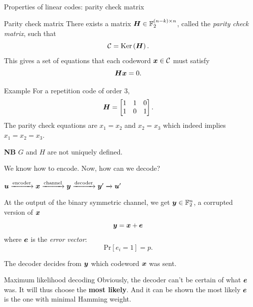 \documentclass[10pt]{beamer}
\newcommand{\gf}{\mathbb{F}_2}
\renewcommand{\ker}[1]{\text{Ker}\left(#1\right)}
\begin{document}
\begin{frame}{Properties of linear codes: parity check matrix}
    \begin{block}{Parity check matrix}
        There exists a matrix $\mH \in \gf^{(n-k)\times n}$, called the \textit{parity
        check matrix}, such that
        \[ \mathcal{C} = \ker{\mH}. \]
        This gives a set of equations that each codeword $\boldsymbol{x} \in \mathcal{C}$ must satisfy
        \[ \boldsymbol{H}\boldsymbol{x} = 0. \]
    \end{block}
    
    \begin{exampleblock}{Example}
        For a repetition code of order 3,
        \[ \boldsymbol{H} =
        \begin{bmatrix}
            1 & 1 & 0 \\
            1 & 0 & 1
        \end{bmatrix}. \]
        The parity check equations are $x_1 = x_2$ and $x_2 = x_3$ which indeed implies
        $x_1 = x_2 = x_3$.
    \end{exampleblock}

    \textbf{NB} $G$ and $H$ are not uniquely defined.
\end{frame}

\begin{frame}{We know how to encode. Now, how can we decode?}
    \begin{center}
        $\boldsymbol{u} \xrightarrow{\text{encoder}} \boldsymbol{x} \xrightarrow{\text{channel}} \boldsymbol{y} \xrightarrow{\text{decoder}} \boldsymbol{y}' \xrightarrow{} \boldsymbol{u}'$
    \end{center}
    At the output of the binary symmetric channel, we get $\vy \in \gf^n$, a corrupted
    version of $\boldsymbol{x}$
    \[ \boldsymbol{y} = \boldsymbol{x} + \boldsymbol{e} \]
    where $\boldsymbol{e}$ is the \textit{error vector}: \[\text{Pr}[e_i = 1] = p.\]

    The decoder decides from $\boldsymbol{y}$ which codeword $\boldsymbol{x}$ was sent.

    \begin{exampleblock}{Maximum likelihood decoding}
        Obviously, the decoder can't be certain of what $\boldsymbol{e}$ was. It will thus
        choose the \textbf{most likely}. And it can be shown the most likely $\boldsymbol{e}$
        is the one with minimal Hamming weight.
    \end{exampleblock}
\end{frame}
\end{document}
